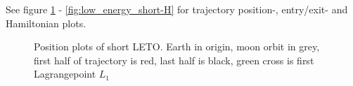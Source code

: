 See figure \ref{fig:low_energy_short-position} - \ref{fig:low_energy_short-H} for trajectory position-, entry/exit- and Hamiltonian plots.

\begin{figure}[ht!]
    \centering
        \caption{Position plots of short LETO. Earth in origin, moon orbit in grey, first half of trajectory is red, last half is black, green cross is first Lagrangepoint $L_1$}
        \label{fig:low_energy_short-position}
\end{figure}

